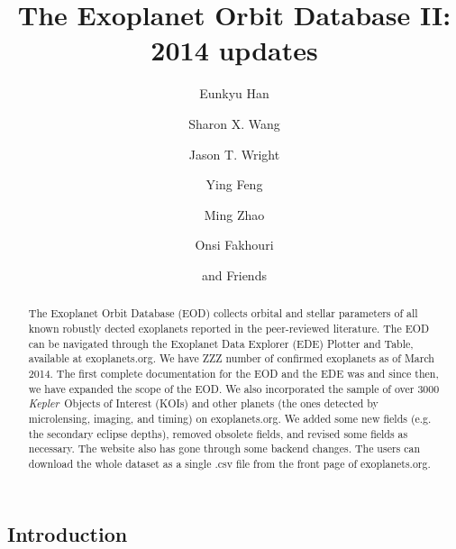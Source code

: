 \documentclass[11pt,preprint]{aastex}
\def\kepler{\textit{Kepler}}
\begin{document}
\begin{CJK*}{UTF8}{gbsn}

\title{The Exoplanet Orbit Database \textsc{II}: 2014 updates}

\author{Eunkyu Han}
\author{Sharon X. Wang}
\author{Jason T. Wright}
\author{Ying Feng}
\author{Ming Zhao}
\author{Onsi Fakhouri}
\author{and Friends}



\begin{abstract}

The Exoplanet Orbit Database (EOD) collects orbital and stellar
parameters of all known robustly dected exoplanets reported in the peer-reviewed
literature. The EOD can be navigated through the Exoplanet Data
Explorer (EDE) Plotter and Table, available at exoplanets.org. We have
ZZZ number of confirmed exoplanets as of March 2014.  
The first complete documentation for the EOD and the EDE was
\cite{Wright2011} and since then, we have expanded the scope of the
EOD. We also incorporated the sample of over 3000 \kepler\ Objects of
Interest (KOIs) and other planets (the ones detected by microlensing,
imaging, and timing) on exoplanets.org. We added some new fields
(e.g. the secondary eclipse depths), removed obsolete fields, and
revised some fields as necessary. The website also has gone through
some backend changes. The users can download the whole dataset as a
single .csv file from the front page of exoplanets.org. 

\end{abstract}  

\section{Introduction}\label{sec:intro}


\end{CJK*}
\end{document}
